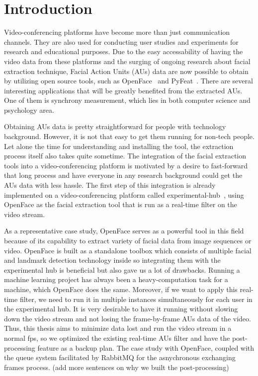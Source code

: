 
\chapter{Introduction}\label{chapter:introduction}

Video-conferencing platforms have become more than just communication channels. 
They are also used for conducting user studies and experiments for research and educational purposes.
Due to the easy accessability of having the video data from these platforms and the surging of ongoing research about facial extraction technique,
Facial Action Units (AUs) data are now possible to obtain by utilizing open source tools, such as OpenFace~\parencite{openface} and PyFeat~\parencite{py-feat}.
There are several interesting applications that will be greatly benefited from
the extracted AUs. One of them is synchrony measurement, which lies in both computer science and psychology area.

Obtaining AUs data is pretty straightforward for people with technology background. However, it is not that easy to get them running for non-tech people. 
Let alone the time for understanding and installing the tool, the extraction process itself also takes quite sometime.
The integration of the facial extraction tools into a video-conferencing platform is motivated by a desire to fast-forward that long process 
and have everyone in any research background could get the AUs data with less hassle.
The first step of this integration is already implemented on a video-conferencing platform called experimental-hub~\parencite{experimental-hub},
using OpenFace as the facial extraction tool that is run as a real-time filter on the video stream.

As a representative case study, OpenFace serves as a powerful tool in this field because of its capability to extract variety of facial data from image sequences or video.
OpenFace is built as a standalone toolbox which consists of multiple facial and landmark detection technology inside 
so integrating them with the experimental hub is beneficial but also gave us a lot of drawbacks. 
Running a machine learning project has always been a heavy-computation task for a machine, which OpenFace does the same.
 Moreover, if we want to apply this real-time filter, we need to run it in multiple instances simultaneously for each user in the experimental hub.
It is very desirable to have it running without slowing down the video stream and not losing the frame-by-frame AUs data of the video.
Thus, this thesis aims to minimize data lost and run the video stream in a normal fps, so we optimized the existing real-time AUs filter 
and have the post-processing feature as a backup plan.
The case study with OpenFace, coupled with the queue system 
facilitated by RabbitMQ for the asnychronous exchanging frames process.
(add more sentences on why we built the post-processing)
